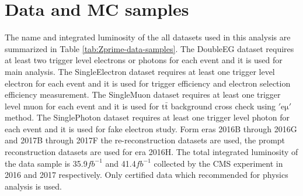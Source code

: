 \section{Data and MC samples}\label{sec:Zprime_data_mc}
The name and integrated luminosity of the all datasets used in this analysis are summarized in Table \ref{tab:Zprime-data-samples}. The DoubleEG dataset requires at least two trigger level electrons or photons for each event and it is used for main analysis. The SingleElectron dataset requires at least one trigger level electron for each event and it is used for trigger efficiency and electron selection efficiency measurement. The SingleMuon dataset requires at least one trigger level muon for each event and it is used for $\mathrm{t\bar{t}}$ background cross check using $\mathrm{'e\mu'}$ method. The SinglePhoton dataset requires at least one trigger level photon for each event and it is used for fake electron study. Form eras 2016B through 2016G and 2017B through 2017F the re-reconstruction datasets are used, the prompt reconstruction datasets are used for era 2016H. The total integrated luminosity of the data sample is 35.9$fb^{-1}$ and 41.4$fb^{-1}$ collected by the CMS experiment in 2016 and 2017 respectively. Only certified data which recommended for physics analysis is used.
